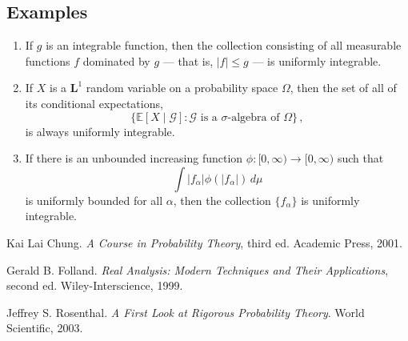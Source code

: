 \documentclass[12pt]{article}
\newcommand{\Le}{\mathbf{L}}
\newcommand{\E}{\mathbb{E}}
\providecommand{\abs}[1]{\lvert#1\rvert}
\begin{document}
\subsection*{Examples}
\begin{enumerate}
\item
If $g$ is an integrable function, then 
the collection consisting of
all measurable functions $f$ dominated by $g$ --- that is, $\abs{f} \leq g$ ---
is uniformly integrable.

\item
If $X$ is a $\Le^1$ random variable on a probability space $\Omega$,
then the set of all of its conditional expectations, \[
\{ \E[X \mid \mathcal{G}] \colon \mathcal{G}\text{ is a $\sigma$-algebra of $\Omega$} \}\,,
\]
 is always uniformly integrable.

\item
If there is an unbounded increasing function $\phi\colon [0, \infty) \to [0, \infty)$ such that 
\[
\int \abs{f_\alpha} \phi(\abs{f_\alpha}) \, d\mu
\]
is uniformly bounded for all $\alpha$,
then the collection $\{ f_\alpha \}$ is uniformly integrable.

\end{enumerate}

\begin{thebibliography}{3}
Kai Lai Chung. {\it A Course in Probability Theory}, third ed. Academic Press, 2001.

Gerald B. Folland. {\it Real Analysis: Modern Techniques and Their Applications}, second ed. Wiley-Interscience, 1999.

Jeffrey S. Rosenthal. {\it A First Look at Rigorous Probability Theory}.
World Scientific, 2003.

\end{thebibliography}

\end{document}
